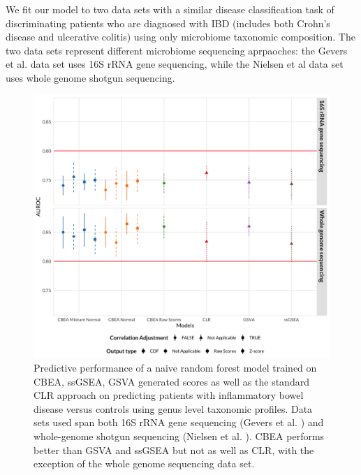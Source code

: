 \documentclass[10pt,letterpaper]{article}
\begin{document}

We fit our model to two data sets with a similar disease classification task of discriminating patients who are diagnosed with IBD (includes both Crohn's disease and ulcerative colitis) using only microbiome taxonomic composition. The two data sets represent different microbiome sequencing aprpaoches: the Gevers et al. \cite{gevers2014} data set uses 16S rRNA gene sequencing, while the Nielsen et al \cite{nielsen2014} data set uses whole genome shotgun sequencing. 

\begin{figure}[!h]
    \centering
    \includegraphics[width = \linewidth]{figures/data_pred.png}
    \caption{Predictive performance of a naive random forest model trained on CBEA, ssGSEA, GSVA generated scores as well as the standard CLR approach on predicting patients with inflammatory bowel disease versus controls using genus level taxonomic profiles. Data sets used span both 16S rRNA gene sequencing (Gevers et al. \cite{gevers2014}) and whole-genome shotgun sequencing (Nielsen et al. \cite{nielsen2014}). CBEA performs better than GSVA and ssGSEA but not as well as CLR, with the exception of the whole genome sequencing data set.}
    \label{fig:6}
\end{figure}
\end{document}
